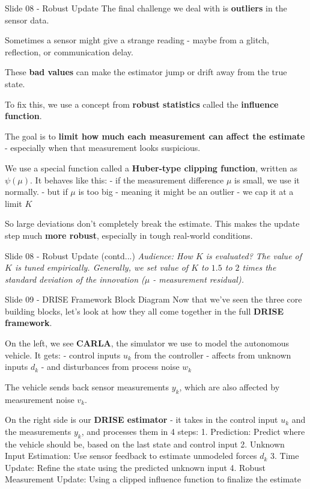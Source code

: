 \documentclass{beamer}
\begin{document}
\begin{frame}{Slide 08 - Robust Update}
\protect\hypertarget{slide-08---robust-update}{}
The final challenge we deal with is \textbf{outliers} in the sensor
data.

Sometimes a sensor might give a strange reading - maybe from a glitch,
reflection, or communication delay.

These \textbf{bad values} can make the estimator jump or drift away from
the true state.

To fix this, we use a concept from \textbf{robust statistics} called the
\textbf{influence function}.

The goal is to \textbf{limit how much each measurement can affect the
estimate} - especially when that measurement looks suspicious.

We use a special function called a \textbf{Huber-type clipping
function}, written as \(\psi(\mu)\). It behaves like this: - if the
measurement difference \(\mu\) is small, we use it normally. - but if
\(\mu\) is too big - meaning it might be an outlier - we cap it at a
limit \(K\)

So large deviations don't completely break the estimate. This makes the
update step much \textbf{more robust}, especially in tough real-world
conditions.
\end{frame}

\begin{frame}{Slide 08 - Robust Update (contd...)}
\emph{Audience: How \(K\) is evaluated? The value of \(K\) is tuned
empirically. Generally, we set value of \(K\) to \(1.5\) to \(2\) times
the standard deviation of the innovation (\(\mu\) - measurement
residual).}
\end{frame}

\begin{frame}{Slide 09 - DRISE Framework Block Diagram}
\protect\hypertarget{slide-09---drise-framework-block-diagram}{}
Now that we've seen the three core building blocks, let's look at how
they all come together in the full \textbf{DRISE framework}.

On the left, we see \textbf{CARLA}, the simulator we use to model the
autonomous vehicle. It gets: - control inputs \(u_k\) from the
controller - affects from unknown inputs \(d_k\) - and disturbances from
process noise \(w_k\)

The vehicle sends back sensor measurements \(y_k\), which are also
affected by measurement noise \(v_k\).

On the right side is our \textbf{DRISE estimator} - it takes in the
control input \(u_k\) and the measurements \(y_k\), and processes them
in 4 steps: 1. Prediction: Predict where the vehicle should be, based on
the last state and control input 2. Unknown Input Estimation: Use sensor
feedback to estimate unmodeled forces \(d_k\) 3. Time Update: Refine the
state using the predicted unknown input 4. Robust Measurement Update:
Using a clipped influence function to finalize the estimate
\end{frame}
\end{document}
